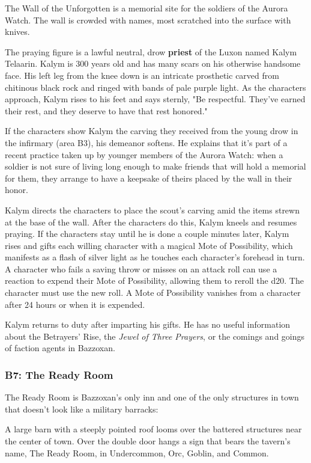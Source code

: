\documentclass[10pt,a4paper,twoside,fancy,bg=print,twocolumn,openany,nodeprecatedcode]{dndbook}
\begin{document}
The Wall of the Unforgotten is a memorial site for the soldiers of the Aurora Watch. The wall is crowded with names, most scratched into the surface with knives.

The praying figure is a lawful neutral, drow \textbf{priest} of the Luxon named Kalym Telaarin. Kalym is 300 years old and has many scars on his otherwise handsome face. His left leg from the knee down is an intricate prosthetic carved from chitinous black rock and ringed with bands of pale purple light. As the characters approach, Kalym rises to his feet and says sternly, "Be respectful. They've earned their rest, and they deserve to have that rest honored."

If the characters show Kalym the carving they received from the young drow in the infirmary (area B3), his demeanor softens. He explains that it's part of a recent practice taken up by younger members of the Aurora Watch: when a soldier is not sure of living long enough to make friends that will hold a memorial for them, they arrange to have a keepsake of theirs placed by the wall in their honor.

Kalym directs the characters to place the scout's carving amid the items strewn at the base of the wall. After the characters do this, Kalym kneels and resumes praying. If the characters stay until he is done a couple minutes later, Kalym rises and gifts each willing character with a magical Mote of Possibility, which manifests as a flash of silver light as he touches each character's forehead in turn. A character who fails a saving throw or misses on an attack roll can use a reaction to expend their Mote of Possibility, allowing them to reroll the d20. The character must use the new roll. A Mote of Possibility vanishes from a character after 24 hours or when it is expended.

Kalym returns to duty after imparting his gifts. He has no useful information about the Betrayers' Rise, the \textit{Jewel of Three Prayers}, or the comings and goings of faction agents in Bazzoxan.

\subsubsection{B7: The Ready Room}
The Ready Room is Bazzoxan's only inn and one of the only structures in town that doesn't look like a military barracks:

\begin{DndReadAloud}{}
A large barn with a steeply pointed roof looms over the battered structures near the center of town. Over the double door hangs a sign that bears the tavern's name, The Ready Room, in Undercommon, Orc, Goblin, and Common.

\end{DndReadAloud}
\end{document}
